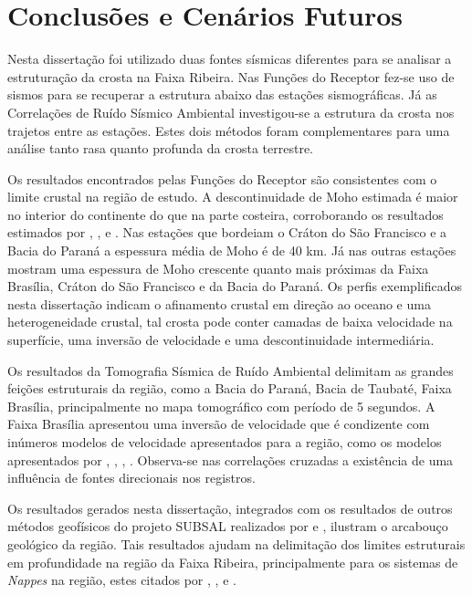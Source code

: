 \chapter{Conclusões e Cenários Futuros}

Nesta dissertação foi utilizado duas fontes sísmicas diferentes para se analisar a estruturação da crosta na Faixa Ribeira. Nas Funções do Receptor fez-se uso de sismos para se recuperar a estrutura abaixo das estações sismográficas. Já as Correlações de Ruído Sísmico Ambiental investigou-se a estrutura da crosta nos trajetos entre as estações. Estes dois métodos foram complementares para uma análise tanto rasa quanto profunda da crosta terrestre.

Os resultados encontrados pelas Funções do Receptor são consistentes com o limite crustal na região de estudo. A descontinuidade de Moho estimada é maior no interior do continente do que na parte costeira, corroborando os resultados estimados por \cite{sand_franca_crustal_2004}, \cite{Assumpcao_America_2013}, \cite{Assumpcao_Brazil_2013} e \cite{van_der_meijde_gravity_2013}. Nas estações que bordeiam o Cráton do São Francisco e a Bacia do Paraná a espessura média de Moho é de 40 km. Já nas outras estações mostram uma espessura de Moho crescente quanto mais próximas da Faixa Brasília, Cráton do São Francisco e da Bacia do Paraná. Os perfis exemplificados nesta dissertação indicam o afinamento crustal em direção ao oceano e uma heterogeneidade crustal, tal crosta pode conter camadas de baixa velocidade na superfície, uma inversão de velocidade e uma descontinuidade intermediária.

Os resultados da Tomografia Sísmica de Ruído Ambiental delimitam as grandes feições estruturais da região, como a Bacia do Paraná, Bacia de Taubaté, Faixa Brasília, principalmente no mapa tomográfico com período de 5 segundos. A Faixa Brasília apresentou uma inversão de velocidade que é condizente com inúmeros modelos de velocidade apresentados para a região, como os modelos apresentados por \cite{sand_franca_crustal_2004}, \cite{dias_cario_crustal_2006}, \cite{flora_solon_ancient_2013}, \cite{Silva_2014}. Observa-se nas correlações cruzadas a existência de uma influência de fontes direcionais nos registros. 

Os resultados gerados nesta dissertação, integrados com os resultados de outros métodos geofísicos do projeto SUBSAL realizados por \cite{flora_solon_ancient_2013} e \cite{Silva_2014}, ilustram o arcabouço geológico da região. Tais resultados ajudam na delimitação dos limites estruturais em profundidade na região da Faixa Ribeira, principalmente para os sistemas de \textit{Nappes} na região, estes citados por  \cite{heilbron_evolution_2010}, \cite{valeriano_u_pb_2011},  \cite{heilbron_serra_2013} e \cite{trouw_new_2013}. 

